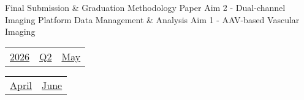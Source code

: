 \vfill{\centering{} \small{Final Submission \& Graduation}\hspace{1.5em} \small{Methodology Paper}\hspace{1.5em} \small{Aim 2 - Dual-channel Imaging Platform}\hspace{1.5em} \small{Data Management \& Analysis}\hspace{1.5em} \small{Aim 1 - AAV-based Vascular Imaging}\hspace{1.5em}\par}

\pagebreak
{\noindent\Large\renewcommand{\arraystretch}{\myNumArrayStretch}\begin{tabular}{|l|l|l}
\hyperlink{2026}{2026} & \hyperlink{Q2}{Q2} & \hyperlink{May}{May}
\end{tabular}\hfill%
\begin{tabular}{r|r@{}}
\hyperlink{month-2026-4}{April} & \hyperlink{month-2026-6}{June}
\end{tabular}}
\myLineThick
